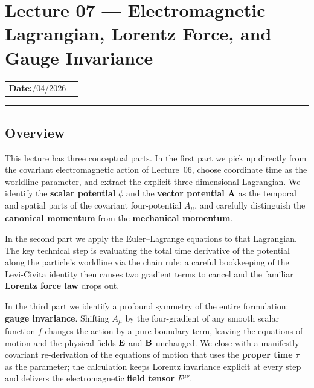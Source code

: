 \section{Lecture 07 — Electromagnetic Lagrangian, Lorentz Force, and Gauge Invariance}\label{sec:lec07}

\begin{center}
\begin{tabular}{ll}
  \textbf{Date:}\quad 28/04/2026 & \\
\end{tabular}
\end{center}
\hrule\vspace{1.5em}

\subsection*{Overview}
This lecture has three conceptual parts.  In the first part we pick up directly
from the covariant electromagnetic action of Lecture~06, choose coordinate time
as the worldline parameter, and extract the explicit three-dimensional Lagrangian.
We identify the \textbf{scalar potential} $\phi$ and the \textbf{vector potential}
$\mathbf{A}$ as the temporal and spatial parts of the covariant four-potential $A_\mu$,
and carefully distinguish the \textbf{canonical momentum} from the \textbf{mechanical
momentum}.

In the second part we apply the Euler--Lagrange equations to that Lagrangian.
The key technical step is evaluating the total time derivative of the potential
along the particle's worldline via the chain rule; a careful bookkeeping of the
Levi-Civita identity then causes two gradient terms to cancel and the familiar
\textbf{Lorentz force law} drops out.

In the third part we identify a profound symmetry of the entire formulation:
\textbf{gauge invariance}.  Shifting $A_\mu$ by the four-gradient of any smooth
scalar function $f$ changes the action by a pure boundary term, leaving the
equations of motion and the physical fields $\mathbf{E}$ and $\mathbf{B}$ unchanged.  We
close with a manifestly covariant re-derivation of the equations of motion that
uses the \textbf{proper time} $\tau$ as the parameter; the calculation keeps
Lorentz invariance explicit at every step and delivers the electromagnetic
\textbf{field tensor} $F^{\mu\nu}$.

